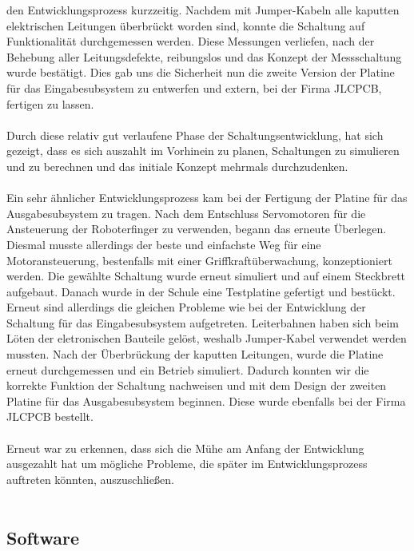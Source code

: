 \documentclass[titlepage,12pt,twoside]{article}
\begin{document}
den Entwicklungsprozess kurzzeitig. Nachdem mit Jumper-Kabeln alle kaputten elektrischen Leitungen überbrückt worden sind, konnte die Schaltung auf Funktionalität durchgemessen werden.
Diese Messungen verliefen, nach der Behebung aller Leitungsdefekte, reibungslos und das Konzept der Messschaltung wurde bestätigt. Dies gab uns die Sicherheit nun die zweite Version der
Platine für das Eingabesubsystem zu entwerfen und extern, bei der Firma JLCPCB, fertigen zu lassen. \\
\\
Durch diese relativ gut verlaufene Phase der Schaltungsentwicklung, hat sich gezeigt, dass es sich auszahlt im Vorhinein zu planen, Schaltungen zu simulieren und zu berechnen und das initiale Konzept mehrmals durchzudenken. \\
\\
Ein sehr ähnlicher Entwicklungsprozess kam bei der Fertigung der Platine für das Ausgabesubsystem zu tragen. Nach dem Entschluss Servomotoren für die Ansteuerung der Roboterfinger zu verwenden, begann das erneute Überlegen. Diesmal
musste allerdings der beste und einfachste Weg für eine Motoransteuerung, bestenfalls mit einer Griffkraftüberwachung, konzeptioniert werden. Die gewählte Schaltung wurde erneut simuliert und auf einem Steckbrett aufgebaut. 
Danach wurde in der Schule eine Testplatine gefertigt und bestückt. Erneut sind allerdings die gleichen Probleme wie bei der Entwicklung der Schaltung für das Eingabesubsystem aufgetreten. Leiterbahnen haben sich beim Löten der 
eletronischen Bauteile gelöst, weshalb Jumper-Kabel verwendet werden mussten. Nach der Überbrückung der kaputten Leitungen, wurde die Platine erneut durchgemessen und ein Betrieb simuliert. Dadurch konnten wir die korrekte Funktion der 
Schaltung nachweisen und mit dem Design der zweiten Platine für das Ausgabesubsystem beginnen. Diese wurde ebenfalls bei der Firma JLCPCB bestellt. \\
\\
Erneut war zu erkennen, dass sich die Mühe am Anfang der Entwicklung ausgezahlt hat um mögliche Probleme, die später im Entwicklungsprozess auftreten könnten, auszuschließen. \\
\\

\subsection{Software}
\end{document}
